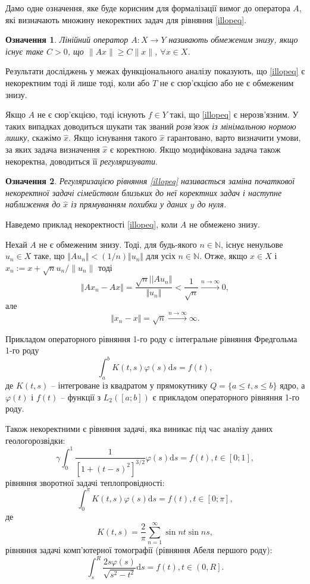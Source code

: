 \documentclass[14pt,twoside]{extreport}
\theoremstyle{mystyle}
\newtheorem{dfn}{Означення}
\numberwithin{equation}{chapter}
\begin{document}
Дамо одне означення, яке буде корисним для формалізації вимог до оператора $A$, які визначають множину некоректних задач для рівняння \eqref{illopeq}.

\begin{dfn}
	Лінійний оператор $A:X\to  Y$ називають обмеженим знизу, якщо існує таке $C>0$, що $\|Ax\| \geqslant C\|x\|$, $\forall x \in X$.
\end{dfn}

Результати досліджень у межах функціонального аналізу показують, що \eqref{illopeq} є некоректним тоді й лише тоді, коли або $T$ не є сюр'єкцією або не є обмеженим знизу.

Якщо $A$ не є сюр'єкцією, тоді існують $f\in Y$ такі, що \eqref{illopeq} є нерозв'язним. У таких випадках доводиться шукати так званий \emph{розв'язок із мінімальною нормою лишку}, скажімо $\hat{x}$. Якщо існування такого $\hat{x}$ гарантовано, варто визначити умови, за яких задача визначення $\hat{x}$ є коректною. Якщо модифікована задача також некоректна, доводиться її \emph{регуляризувати}.

\begin{dfn}
	Регуляризацією рівняння \eqref{illopeq} називається заміна початкової некоректної задачі сімейством \emph{близьких до неї} коректних задач і наступне наближення до $\hat{x}$ із прямуванням похибки у даних $y$ до нуля.
\end{dfn}

Наведемо приклад некоректності \eqref{illopeq}, коли $A$ не обмежено знизу.

Нехай $A$ не є обмеженим знизу. Тоді, для будь-якого $n\in \mathbb{N}$, існує ненульове $u_n \in X$ таке, що $\Vert Au_{n}\Vert<(1/n)\Vert u_{n}\Vert$ для усіх $n\in \mathbb{N}$. Отже, якщо $x\in X$ і $x_{n} :=x+\sqrt{n}u_{n}/\|u_{n}\|$ тоді
$$
\Vert Ax_{n}-Ax\Vert=\frac{\sqrt{n}||Au_{n}\Vert}{\Vert u_{n}\Vert}<\frac{1}{\sqrt{n}}\xrightarrow{n\to\infty} 0,
$$
але
$$
\Vert x_{n}-x\Vert=\sqrt{n}\xrightarrow{n\to\infty}\infty.
$$

Прикладом операторного рівняння 1-го роду є інтегральне рівняння Фредгольма 1-го роду
\begin{equation}\label{fred1oncemore}
 \int_{a}^{b} K(t, s) \varphi(s) \mathrm{d}s = f(t),
\end{equation}
де $K(t, s)$ -- інтегроване із квадратом у прямокутнику $Q=\{a \leqslant t, s \leqslant b\}$ ядро, а $\varphi(t)$ і $f(t)$ -- функції з $L_2([a; b])$ є прикладом операторного рівняння 1-го роду.

Також некоректними є рівняння задачі, яка виникає під час аналізу даних геологорозвідки:
\[
 \gamma\int_{0}^{1} \dfrac{1}{[1+(t-s)^2]^{3/2}}\varphi(s)\mathrm{d}s = f(t), t\in[0;1],
\]
рівняння зворотної задачі теплопровідності:
\[
 \int_{0}^{\pi} K(t, s) \varphi(s)\mathrm{d}s = f(t), t\in\left[0; \pi\right],
\]
де
\[
 K(t,s) = \dfrac{2}{\pi} \sum\limits_{n=1}^{\infty} \sin nt \sin ns,
\]
рівняння задачі комп'ютерної томографії (рівняння Абеля першого роду):
\[
 \int_{s}^{R} \dfrac{2s\varphi(s)}{\sqrt{s^2-t^2}}\mathrm{d}s = f(t), t\in \left(0, R\right].
\]
\end{document}
